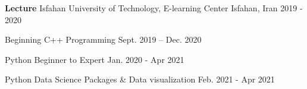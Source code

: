 \cventry 
    {\textbf{Lecture} } %
    {Isfahan University of Technology, E-learning Center} %
    {Isfahan, Iran} %
    {2019 - 2020} %
    {
    \begin{cvitems} %
		\item {Beginning C++ Programming	\hfill			Sept. 2019 – Dec. 2020 }
		\item {Python Beginner to Expert	\hfill			Jan. 2020 - Apr 2021}
		\item {Python Data Science Packages \& Data visualization	\hfill			Feb. 2021 - Apr 2021 }
	\end{cvitems}   
     }
     
     \vspace{10pt}